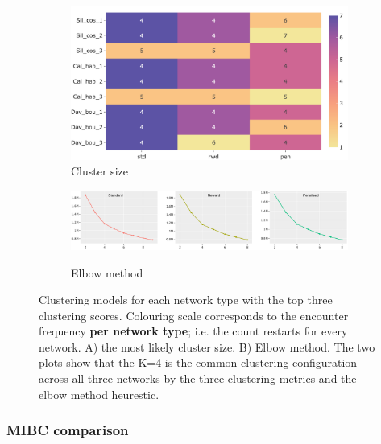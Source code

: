 \begin{figure}[!t]
    \centering
    \begin{subfigure}[!t]{0.8\textwidth}
        \includegraphics[width=\textwidth,keepaspectratio]{Sections/Network_I/Resources/P0/clustering/top3_cs_size_p0_tum4K_50TF_v3.png}
        \caption{Cluster size}
        \label{fig:N_I:p0_metr_size}
    \end{subfigure}
    \begin{subfigure}[!t]{1.0\textwidth}
        \includegraphics[width=\textwidth, keepaspectratio]{Sections/Network_I/Resources/P0/clustering/p0_elbowMethod_4K_v3.png}
        \label{fig:N_I:p0_elbow_method}
        \caption{Elbow method}
    \end{subfigure}
    \caption{Clustering models for each network type with the top three clustering scores. Colouring scale corresponds to the encounter frequency \textbf{per network type}; i.e. the count restarts for every network. A) the most likely cluster size. B) Elbow method. The two plots show that the K=4 is the common clustering configuration across all three networks by the three clustering metrics and the elbow method heurestic. }
    \label{fig:N_I:p0_top_3_metrics_II}
\end{figure}

\subsubsection{MIBC comparison}


